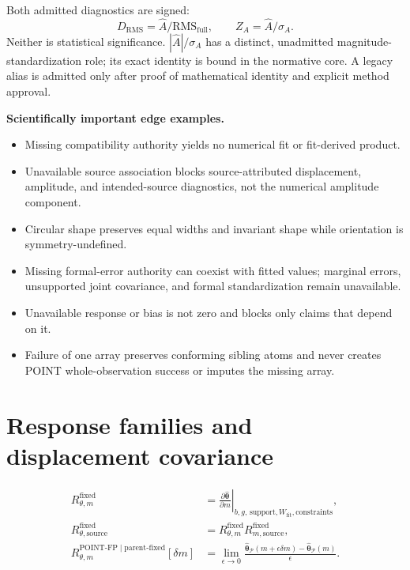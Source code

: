 \documentclass[12pt]{article}
\newcommand{\thetahat}{\widehat{\boldsymbol{\theta}}}
\begin{document}
Both admitted diagnostics are signed:
\begin{equation}
D_{\mathrm{RMS}}=\widehat A/\mathrm{RMS}_{\mathrm{full}},
\qquad Z_A=\widehat A/\sigma_A.
\end{equation}
Neither is statistical significance. $|\widehat A|/\sigma_A$ has a distinct,
unadmitted magnitude-standardization role; its exact identity is bound in the
normative core. A legacy alias is admitted only after proof of mathematical
identity and explicit method approval.

\textbf{Scientifically important edge examples.}
\begin{itemize}
\item Missing compatibility authority yields no numerical fit or fit-derived product.
\item Unavailable source association blocks source-attributed displacement, amplitude, and intended-source diagnostics, not the numerical amplitude component.
\item Circular shape preserves equal widths and invariant shape while orientation is symmetry-undefined.
\item Missing formal-error authority can coexist with fitted values; marginal errors, unsupported joint covariance, and formal standardization remain unavailable.
\item Unavailable response or bias is not zero and blocks only claims that depend on it.
\item Failure of one array preserves conforming sibling atoms and never creates POINT whole-observation success or imputes the missing array.
\end{itemize}

\section{Response families and displacement covariance}

\begin{align}
R^{\mathrm{fixed}}_{\theta,m}
&=\left.\frac{\partial\thetahat}{\partial m}\right|_{b,g,\,
\mathrm{support},W_{\mathrm{fit}},\mathrm{constraints}},\\
R^{\mathrm{fixed}}_{\theta,\mathrm{source}}
&=R^{\mathrm{fixed}}_{\theta,m}R^{\mathrm{fixed}}_{m,\mathrm{source}},\\
R^{\mathrm{POINT\mbox{-}FP}\mid\mathrm{parent\mbox{-}fixed}}_{\theta,m}[\delta m]
&=\lim_{\epsilon\to0}\frac{\widehat{\boldsymbol{\theta}}_{\mathcal P}(m+\epsilon\delta m)-
\widehat{\boldsymbol{\theta}}_{\mathcal P}(m)}{\epsilon}.
\end{align}
\end{document}
